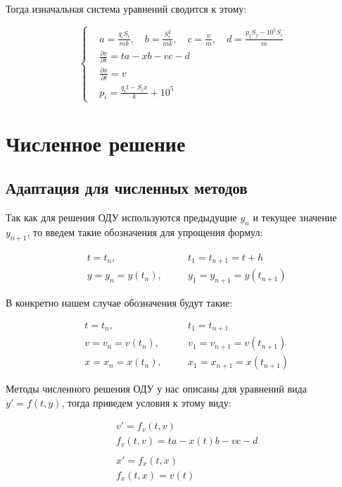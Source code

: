 \documentclass[12pt, a4paper]{article}
\begin{document}
Тогда изначальная система уравнений сводится к этому:

$$\left\{\begin{aligned}
&a = \frac{q_i S_i}{m k}, \quad b = \frac{S_i^2}{m k}, \quad c = \frac{\nu}{m}, \quad d = \frac{p_j S_j-10^5 S_i}{m} \\
&\frac{\partial v}{\partial t} = t a - x b - v c - d \\
&\frac{\partial x}{\partial t} = v \\
&p_i = \frac{q_i t - S_i x}{k} + 10^5
\end{aligned}\right.$$

\section{Численное решение}

\subsection{Адаптация для численных методов}

Так как для решения ОДУ используются предыдущие $y_n$ и текущее значение $y_{n+1}$, то введем такие обозначения для упрощения формул:

$$\begin{aligned}
&t = t_n, \quad &&t_1 = t_{n+1} = t + h \\
&y = y_n = y(t_n), \quad &&y_1 = y_{n+1} = y(t_{n+1})
\end{aligned}$$

В конкретно нашем случае обозначения будут такие:

$$\begin{aligned}
&t = t_n, \quad &&t_1 = t_{n+1} \\
&v = v_n = v(t_n), \quad &&v_1 = v_{n+1} = v(t_{n+1}) \\
&x = x_n = x(t_n), \quad &&x_1 = x_{n+1} = x(t_{n+1})
\end{aligned}$$

Методы численного решения ОДУ у нас описаны для уравнений вида $y' = f(t, y)$, тогда приведем условия к этому виду: 

$$\begin{aligned}
&v' = f_v(t, v) \\
&f_v(t, v) = t a - x(t) b - v c - d \\ \\
&x' = f_x(t, x) \\
&f_x(t, x) = v(t)
\end{aligned}$$
\end{document}
